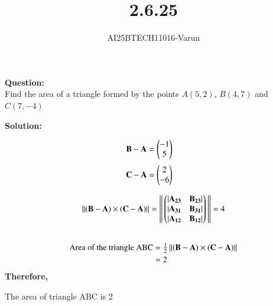 \documentclass[journal]{IEEEtran}
\begin{document}

\vspace{3cm}

\title{2.6.25}
\author{AI25BTECH11016-Varun}
 \maketitle
{\let\newpage\relax\maketitle}
\renewcommand{\thefigure}{\theenumi}
\renewcommand{\thetable}{\theenumi}
\setlength{\intextsep}{10pt} %
\renewcommand{\thetable}{\theenumi}
\textbf{Question:}\\

Find the area of a triangle formed by the points  $A(5,2)$, $B(4,7)$ and $C(7,-4)$



\textbf{Solution:}

\begin{align}
\mathbf{B} - \mathbf{A} &= \begin{pmatrix}-1 \\ 5\end{pmatrix}
\end{align}
\begin{align}
\mathbf{C} - \mathbf{A} & = \begin{pmatrix}2 \\ -6\end{pmatrix} 
\end{align}

\begin{align}
\left\lVert\mathbf{(B-A)} \times \mathbf{(C-A)}\right\rVert = \left\lVert\,\begin{pmatrix}|\mathbf{A_{23}} & \mathbf{B_{23}}| \\ |\mathbf{A_{31}} & \mathbf{B_{31}}| \\ |\mathbf{A_{12}} & \mathbf{B_{12}}|\end{pmatrix}\,\right\rVert 
&=4 \nonumber\\\
\end{align} 
\begin{align}
\text{Area of the triangle ABC} &= \tfrac{1}{2} 
\left\lVert(\mathbf{B} - \mathbf{A}) \times (\mathbf{C} - \mathbf{A}) \right\rVert \\
&=2 
\end{align}
\textbf{Therefore,
}
\begin{center}
    The area of triangle ABC is 2
\end{center}
\end{document}
